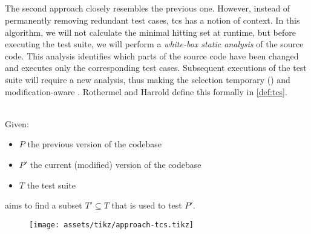
\subsection{\tcs{}}
The second approach closely resembles the previous one. However, instead of permanently removing redundant test cases, \acrfull{tcs} has a notion of context. In this algorithm, we will not calculate the minimal hitting set at runtime, but before executing the test suite, we will perform a \emph{white-box static analysis} of the source code. This analysis identifies which parts of the source code have been changed and executes only the corresponding test cases. Subsequent executions of the test suite will require a new analysis, thus making the selection temporary () and modification-aware \cite{10.1002/stv.430}. Rothermel and Harrold define this formally in \cref{def:tcs}.

\begin{definition}[\tcs{}]
\label{def:tcs}
\mbox{}\\Given:
\begin{itemize}
	\item $P$ the previous version of the codebase
	\item $P'$ the current (modified) version of the codebase
	\item $T$ the test suite
\end{itemize}

\noindent \tcs{} aims to find a subset $T' \subseteq T$ that is used to test $P'$. 
\end{definition}

\begin{figure}[htbp!]
	\centering
	\texttt{[image: assets/tikz/approach-tcs.tikz]}
	\caption{\tcs{}}
	\label{fig:tcs}
\end{figure}

\clearpage